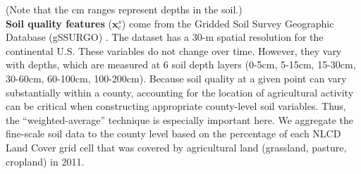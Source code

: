 (Note that the cm ranges represent depths in the soil.)\\

 \textbf{Soil quality features} ($\mathbf{x}_{c}^s$) come from the Gridded Soil Survey Geographic Database (gSSURGO) \cite{soil2019gridded}. The dataset has a 30-m spatial resolution for the continental U.S. These variables do not change over time. However, they vary with depths, which are measured at 6 soil depth layers (0-5cm, 5-15cm, 15-30cm, 30-60cm, 60-100cm, 100-200cm). Because soil quality at a given point can vary substantially within a county, accounting for the location of agricultural activity can be critical when constructing appropriate county-level soil variables. Thus, the ``weighted-average'' technique is especially important here. We aggregate the fine-scale soil data to the county level based on the percentage of each NLCD Land Cover grid cell that was covered by agricultural land (grassland, pasture, cropland) in 2011.
 
